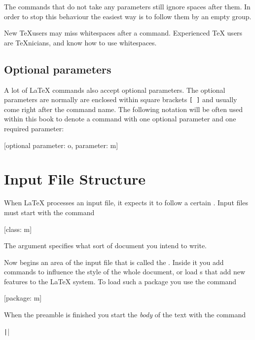 The commands that do not take any parameters still ignore spaces after them. In
order to stop this behaviour the easiest way is to follow them by an empty
group.

\begin{chktexignore}
  \begin{example}[examplewidth=0.45\linewidth]
New \TeX users may miss whitespaces
after a command. %
Experienced \TeX{} users are
\TeX nicians, and know how to use
whitespaces. %
\end{example}
\end{chktexignore}

\subsection{Optional parameters}

A lot of \LaTeX{} commands also accept optional parameters. The optional parameters are normally are enclosed
within square brackets \verb|[ ]| and usually come right after the command
name. The following notation will be often used within this book to denote a
command with one optional parameter and one required parameter:
\begin{lscommand}
  [optional parameter: o, parameter: m]
\end{lscommand}

\section{Input File Structure}\label{sec:structure}
When \LaTeX{} processes an input file, it expects it to follow a
certain . Input files must start with the
command
\begin{code}
  [class: m]
\end{code}
The  argument specifies what sort of document you intend to write.

Now begins an area of the input file that is called the \emph{}.
Inside it you add commands to influence the style of the whole document, or
load s that add new features to the \LaTeX{} system. To load such a
package you use the command
\begin{code}
  [package: m]
\end{code}

When the preamble is finished you start the \emph{body} of the text with the
command
\begin{code}
\texttt||
\end{code}

